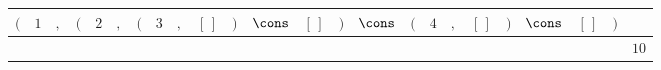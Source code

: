 {\scriptsize\setlength{\tabcolsep}{1.5pt}%
\begin{tabular}{ccccccccccccccccccccccc|l}
$($ & $\text{1}$ & $,$ & $($ & $\text{2}$ & $,$ & $($ & $\text{3}$ & $,$ & $[\,]$ & $)$ & $\cons$ & $[\,]$ & $)$ & $\cons$ & $($ & $\text{4}$ & $,$ & $[\,]$ & $)$ & $\cons$ & $[\,]$ & $)$ & \\ \hline
\gcell{$$} & \gcell{$\posD{\bullet}$} & \gcell{$\posC{\circ}$} & \gcell{$$} & \gcell{$\posD{\bullet}$} & \gcell{$\posC{\circ}$} & \gcell{$$} & \gcell{$\posD{\bullet}$} & \gcell{$\posC{\circ}$} & \gcell{$\posC{\circ}$} & \gcell{$$} & \gcell{$\posC{\circ}$} & \gcell{$\posC{\circ}$} & \gcell{$$} & \gcell{$\posC{\circ}$} & \gcell{$$} & \gcell{$\posD{\bullet}$} & \gcell{$\posC{\circ}$} & \gcell{$\posC{\circ}$} & \gcell{$$} & \gcell{$\posC{\circ}$} & \gcell{$\posC{\circ}$} & \gcell{$$} & $\text{10}$ \\
\end{tabular}}
